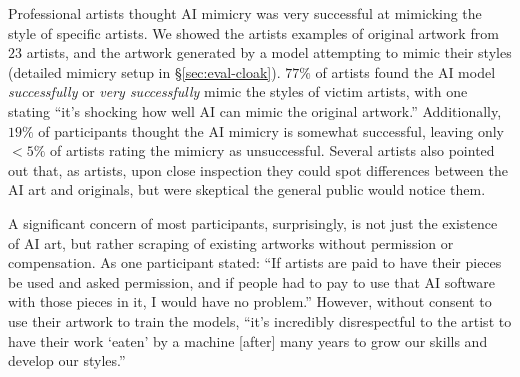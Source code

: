 Professional artists thought AI mimicry was very successful at mimicking the
style of specific artists.  We showed the artists examples of original
artwork from $23$ artists, and the artwork generated by a model
attempting to mimic their styles (detailed mimicry setup in
\S\ref{sec:eval-cloak}).  $77\%$ of artists found the AI model
\textit{successfully} or \textit{very successfully} mimic the styles of
victim artists, with one stating ``it's shocking how well AI can mimic the
original artwork.''  Additionally, $19\%$ of participants thought the AI
mimicry is somewhat successful, leaving only $< 5\%$ of artists rating the
mimicry as unsuccessful.  Several artists also pointed out that, as artists,
upon close inspection they could spot differences between the AI art and
originals, but were skeptical the general public would notice them.

A significant concern of most participants, surprisingly, is not just the
existence of AI art, but rather scraping of existing artworks without
permission or compensation.  As one participant stated: ``If artists are paid
to have their pieces be used and asked permission, and if people had to pay
to use that AI software with those pieces in it, I would have no problem.''
However, without consent to use their artwork to train the models, ``it's
incredibly disrespectful to the artist to have their work `eaten' by a
machine [after] many years to grow our skills and develop our styles.''